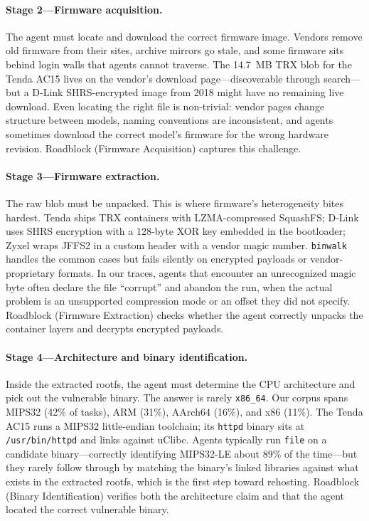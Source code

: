 \paragraph{Stage 2---Firmware acquisition.} The agent must locate and download the correct firmware image. Vendors remove old firmware from their sites, archive mirrors go stale, and some firmware sits behind login walls that agents cannot traverse. The 14.7~MB TRX blob for the Tenda AC15 lives on the vendor's download page---discoverable through search---but a D-Link SHRS-encrypted image from 2018 might have no remaining live download. Even locating the right file is non-trivial: vendor pages change structure between models, naming conventions are inconsistent, and agents sometimes download the correct model's firmware for the wrong hardware revision. Roadblock  (Firmware Acquisition) captures this challenge.

\paragraph{Stage 3---Firmware extraction.} The raw blob must be unpacked. This is where firmware's heterogeneity bites hardest. Tenda ships TRX containers with LZMA-compressed SquashFS; D-Link uses SHRS encryption with a 128-byte XOR key embedded in the bootloader; Zyxel wraps JFFS2 in a custom header with a vendor magic number. \texttt{binwalk} handles the common cases but fails silently on encrypted payloads or vendor-proprietary formats. In our traces, agents that encounter an unrecognized magic byte often declare the file ``corrupt'' and abandon the run, when the actual problem is an unsupported compression mode or an offset they did not specify. Roadblock  (Firmware Extraction) checks whether the agent correctly unpacks the container layers and decrypts encrypted payloads.

\paragraph{Stage 4---Architecture and binary identification.} Inside the extracted rootfs, the agent must determine the CPU architecture and pick out the vulnerable binary. The answer is rarely \texttt{x86\_64}. Our corpus spans MIPS32 (42\% of tasks), ARM (31\%), AArch64 (16\%), and x86 (11\%). The Tenda AC15 runs a MIPS32 little-endian toolchain; its \texttt{httpd} binary sits at \texttt{/usr/bin/httpd} and links against uClibc. Agents typically run \texttt{file} on a candidate binary---correctly identifying MIPS32-LE about 89\% of the time---but they rarely follow through by matching the binary's linked libraries against what exists in the extracted rootfs, which is the first step toward rehosting. Roadblock  (Binary Identification) verifies both the architecture claim and that the agent located the correct vulnerable binary.

